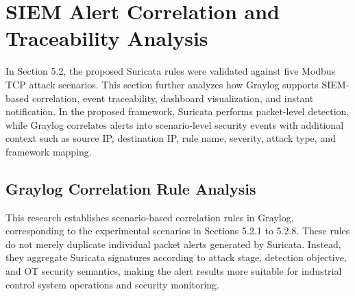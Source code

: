 \newpage

\section{SIEM Alert Correlation and Traceability Analysis}

In Section 5.2, the proposed Suricata rules were validated against five Modbus TCP attack scenarios. This section further analyzes how Graylog supports SIEM-based correlation, event traceability, dashboard visualization, and instant notification. In the proposed framework, Suricata performs packet-level detection, while Graylog correlates alerts into scenario-level security events with additional context such as source IP, destination IP, rule name, severity, attack type, and framework mapping.

\subsection{Graylog Correlation Rule Analysis}
This research establishes scenario-based correlation rules in Graylog, corresponding to the experimental scenarios in Sections 5.2.1 to 5.2.8. These rules do not merely duplicate individual packet alerts generated by Suricata. Instead, they aggregate Suricata signatures according to attack stage, detection objective, and OT security semantics, making the alert results more suitable for industrial control system operations and security monitoring.


